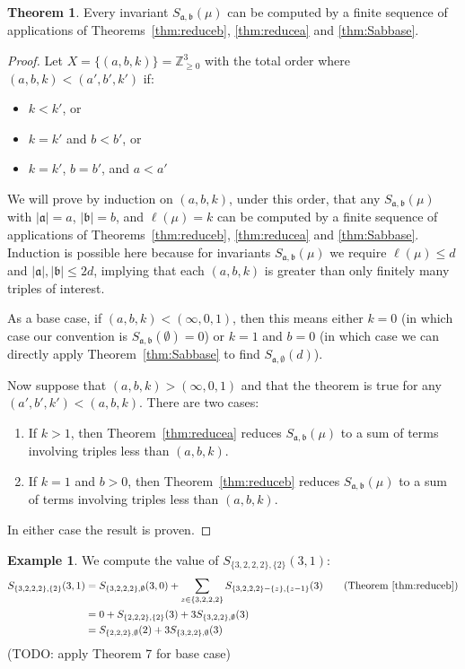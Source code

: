 \documentclass[11pt]{article}           %
\newcommand{\Z}{\ensuremath{\mathbb{Z}}}
\renewcommand{\a}{\mathfrak a}
\renewcommand{\b}{\mathfrak b}
\theoremstyle{definition}
\newtheorem{thm}{Theorem}[section]
\newtheorem{eg}{Example}[section]
\begin{document}
\begin{thm}
  Every invariant $S_{\a,\b}(\mu)$ can be computed by
  a finite
  sequence of applications of Theorems~\ref{thm:reduceb}, \ref{thm:reducea} and \ref{thm:Sabbase}.
  \end{thm}
\begin{proof}
  Let $X=\{(a,b,k)\}=\Z_{\geq 0}^3$ with the total order where
  $(a,b,k)<(a',b',k')$
  if:
  \begin{itemize}
  \item $k<k'$, or
  \item $k=k'$ and $b<b'$, or
    \item $k=k'$, $b=b'$, and $a<a'$
  \end{itemize}
  We will prove by induction on $(a,b,k)$, under this order, that
  any $S_{\a,\b}(\mu)$ with $|\a|=a$, $|\b|=b$, and $\ell(\mu)=k$
  can be computed by a finite sequence of applications
  of Theorems~\ref{thm:reduceb}, \ref{thm:reducea} and \ref{thm:Sabbase}.
  Induction is possible here because for invariants $S_{\a,\b}(\mu)$
  we require $\ell(\mu)\leq d$ and $|\a|,|\b|\leq 2d$, implying
  that each $(a,b,k)$ is greater than only finitely many triples
  of interest.
  
  As a base case, if $(a,b,k)<(\infty,0,1)$, then
  this means either $k=0$ (in which case
  our convention is $S_{\a,\b}(\emptyset)=0$) or $k=1$ and $b=0$
  (in which case we can directly apply Theorem~\ref{thm:Sabbase} to find
  $S_{\a,\emptyset}(d)$).

  Now suppose that $(a,b,k)>(\infty,0,1)$
  and that the theorem is true for any $(a',b',k')<(a,b,k)$. There are two cases:
  \begin{enumerate}
  \item If $k>1$, then Theorem~\ref{thm:reducea} reduces $S_{\a,\b}(\mu)$ to
    a sum of terms involving triples less than $(a,b,k)$.
  \item If $k=1$ and $b>0$, then Theorem~\ref{thm:reduceb} reduces
    $S_{\a,\b}(\mu)$ to a sum of terms involving triples less than $(a,b,k)$.
  \end{enumerate}
  In either case the result is proven.
\end{proof}

\begin{eg}
  We compute the value of $S_{\{3,2,2,2\},\{2\}}(3,1)$:
  \begin{align*}
    S_{\{3,2,2,2\},\{2\}}(3,1) &= S_{\{3,2,2,2\},\emptyset}(3,0)+\sum_{z\in\{3,2,2,2\}}S_{\{3,2,2,2\}-\{z\},\{z-1\}}(3) \tag*{(Theorem~\ref{thm:reduceb})} \\
    &=0+S_{\{2,2,2\},\{2\}}(3)+3S_{\{3,2,2\},\emptyset}(3) \\
    &=S_{\{2,2,2\},\emptyset}(2)+3S_{\{3,2,2\},\emptyset}(3)
  \end{align*}
  (TODO: apply Theorem 7 for base case)
\end{eg}
\end{document}

